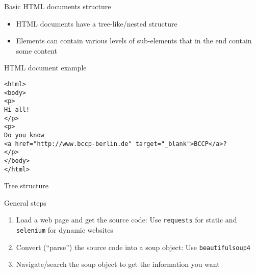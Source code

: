\begin{frame}{Basic HTML documents structure}
\begin{itemize}
	\item HTML documents have a tree-like/nested structure
	\item Elements can contain various levels of sub-elements that in the end contain some content
\end{itemize}
\end{frame}

\begin{frame}[fragile]{HTML document example}
\begin{verbatim}
<html>
<body>
<p>
Hi all!
</p>
<p>
Do you know 
<a href="http://www.bccp-berlin.de" target="_blank">BCCP</a>?
</p>
</body>
</html>
\end{verbatim}
\end{frame}

\begin{frame}[fragile]{Tree structure}
\begin{center}
\end{center}
\end{frame}

\begin{frame}[fragile]{General steps}
\begin{enumerate}
	\item Load a web page and get the source code: Use \verb!requests! for static and \verb!selenium! for dynamic websites
	\item Convert (``parse'') the source code into a soup object: Use \verb!beautifulsoup4!
	\item Navigate/search the soup object to get the information you want
\end{enumerate}
\end{frame}

